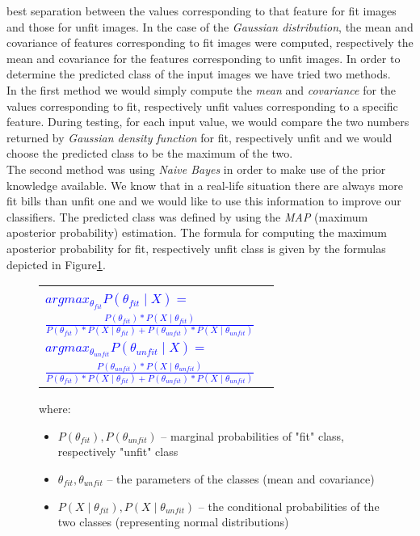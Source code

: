 \documentclass[11pt,twocolumn]{article}
\begin{document}
			best separation between the values corresponding to that feature for fit
			images and those for unfit images. In the case of the \emph{Gaussian
			distribution}, the mean and covariance of features corresponding to fit
			images were computed, respectively the mean and covariance for the features
			corresponding to unfit images. In order to determine the predicted class of
			the input images we have tried two methods.\\ 
			\hspace*{10px}In the first method we would simply compute the \emph{mean} and
			\emph{covariance} for the values corresponding to fit, respectively unfit
			values corresponding to a specific feature. During testing, for each input
			value, we would compare the two numbers returned by \emph{Gaussian density
			function} for fit, respectively unfit and we would choose the predicted class
			to be the maximum of the two.\\ 
			\hspace*{10px}The second method was using \emph{Naive Bayes} in order to make
			use of the prior knowledge available. We know that in a real-life situation
			there are always more fit bills than unfit one and we would like to use this
			information to improve our classifiers. The predicted class was defined by
			using the \emph{MAP} (maximum aposterior probability) estimation. The formula
			for computing the maximum aposterior probability for fit, respectively unfit
			class is given by the formulas depicted in Figure\ref{MAP_formula}.\\
			\begin{figure}[!hbtp] \selectfont\small
				\caption{}
				\begin{tabular}{|lr|} \hline
					&\\[5pt]
					\textcolor{blue}{$argmax_{\theta_{fit}}P(\theta_{fit}\mid X) = $} &\\[5pt]
					\hspace*{50px}\textcolor{blue}{$\frac{P(\theta_{fit})*P(X\mid \theta_{fit})}{P(\theta_{fit})*P(X\mid \theta_{fit}) + P(\theta_{unfit})*P(X\mid \theta_{unfit})}$} &\\[15pt]
					\textcolor{blue}{$argmax_{\theta_{unfit}}P(\theta_{unfit}\mid X) = $} &\\[5pt]
					\hspace*{50px}\textcolor{blue}{$\frac{P(\theta_{unfit})*P(X\mid \theta_{unfit})}{P(\theta_{fit})*P(X\mid \theta_{fit}) + P(\theta_{unfit})*P(X\mid \theta_{unfit})}$} &\\[10pt]
			\hline
			\end{tabular}
					where: 
					\begin{itemize}
					\item $P(\theta_{fit}), P(\theta_{unfit})$ -- marginal probabilities of
						"fit" class, respectively "unfit" class
					\item $\theta_{fit}, \theta_{unfit}$ -- the parameters of the classes (mean
						and covariance)
					\item $P(X\mid \theta_{fit}),P(X\mid \theta_{unfit})$ -- the conditional
						probabilities of the two classes (representing normal distributions)
					\end{itemize} 
			\label{MAP_formula}
			\end{figure}
\end{document}
